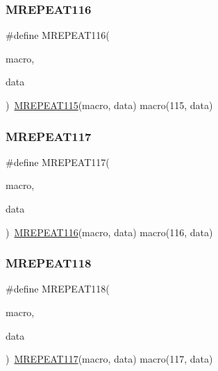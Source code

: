 \mbox{\label{group__group__sam0__utils__mrepeat_gad60209ee8f18b1ecf655a810044966aa}} 
\subsubsection{\texorpdfstring{MREPEAT116}{MREPEAT116}}
{\footnotesize\ttfamily \#define M\+R\+E\+P\+E\+A\+T116(\begin{DoxyParamCaption}\item[{}]{macro,  }\item[{}]{data }\end{DoxyParamCaption})~\mbox{\hyperlink{group__group__sam0__utils__mrepeat_ga065e40294f3d496aa0d661ef472f7914}{M\+R\+E\+P\+E\+A\+T115}}(macro, data)   macro(115, data)}

\mbox{\label{group__group__sam0__utils__mrepeat_gaa23405f68b33c1b3f14c3e45eb3f917a}} 
\subsubsection{\texorpdfstring{MREPEAT117}{MREPEAT117}}
{\footnotesize\ttfamily \#define M\+R\+E\+P\+E\+A\+T117(\begin{DoxyParamCaption}\item[{}]{macro,  }\item[{}]{data }\end{DoxyParamCaption})~\mbox{\hyperlink{group__group__sam0__utils__mrepeat_gad60209ee8f18b1ecf655a810044966aa}{M\+R\+E\+P\+E\+A\+T116}}(macro, data)   macro(116, data)}

\mbox{\label{group__group__sam0__utils__mrepeat_ga74dc399001884d2f1f942b502ce2b9b6}} 
\subsubsection{\texorpdfstring{MREPEAT118}{MREPEAT118}}
{\footnotesize\ttfamily \#define M\+R\+E\+P\+E\+A\+T118(\begin{DoxyParamCaption}\item[{}]{macro,  }\item[{}]{data }\end{DoxyParamCaption})~\mbox{\hyperlink{group__group__sam0__utils__mrepeat_gaa23405f68b33c1b3f14c3e45eb3f917a}{M\+R\+E\+P\+E\+A\+T117}}(macro, data)   macro(117, data)}

